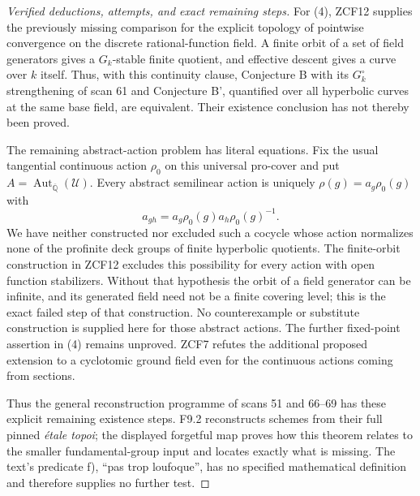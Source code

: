 \begin{proof}[Verified deductions, attempts, and exact remaining steps]
For (4), ZCF12 supplies the previously missing comparison for
the explicit topology of pointwise convergence on the discrete
rational-function field. A finite orbit of a set of field
generators gives a $G_k$-stable finite quotient, and effective
descent gives a curve over $k$ itself. Thus, with this continuity
clause, Conjecture B with its $G_k^\circ$ strengthening of scan 61
and Conjecture B', quantified over all hyperbolic curves at the
same base field, are equivalent. Their existence conclusion has
not thereby been proved.

The remaining abstract-action problem has literal equations.
Fix the usual tangential continuous action $\rho_0$ on this
universal pro-cover and put
$A=\operatorname{Aut}_{\overline{\mathbb Q}}(\mathcal U)$.
Every abstract semilinear action is uniquely
$\rho(g)=a_g\rho_0(g)$ with
\[
 a_{gh}=a_g\rho_0(g)a_h\rho_0(g)^{-1}.
\]
We have neither constructed nor excluded such a cocycle whose
action normalizes none of the profinite deck groups of finite
hyperbolic quotients. The finite-orbit construction in ZCF12
excludes this possibility for every action with open function
stabilizers. Without that hypothesis the orbit of a field
generator can be infinite, and its generated field need not be
a finite covering level; this is the exact failed step of that
construction. No counterexample or substitute construction is
supplied here for those abstract actions. The further fixed-point
assertion in (4) remains unproved. ZCF7 refutes the additional
proposed extension to a cyclotomic ground field even for the
continuous actions coming from sections.

Thus the general reconstruction programme of scans 51 and 66--69
has these explicit remaining existence steps. F9.2 reconstructs
schemes from their full pinned \emph{\'etale topoi}; the displayed
forgetful map proves how this theorem relates to the smaller
fundamental-group input and locates exactly what is missing.
The text's predicate f), ``pas trop loufoque'', has no specified
mathematical definition and therefore supplies no further test.
\end{proof}

